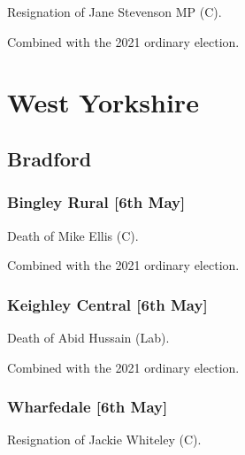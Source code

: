 \documentclass[a4paper,openany]{book}
\begin{document}
\begin{resultsiii}

Resignation of Jane Stevenson MP (C).

Combined with the 2021 ordinary election.

\section{West Yorkshire}

\subsection*{Bradford}

\subsubsection*{Bingley Rural \hspace*{\fill}\nolinebreak[1]%
	\enspace\hspace*{\fill}
	[6th May]}


Death of Mike Ellis (C).

Combined with the 2021 ordinary election.

\subsubsection*{Keighley Central \hspace*{\fill}\nolinebreak[1]%
	\enspace\hspace*{\fill}
	[6th May]}


Death of Abid Hussain (Lab).

Combined with the 2021 ordinary election.

\subsubsection*{Wharfedale \hspace*{\fill}\nolinebreak[1]%
	\enspace\hspace*{\fill}
	[6th May]}


Resignation of Jackie Whiteley (C).


\end{resultsiii}
\end{document}
